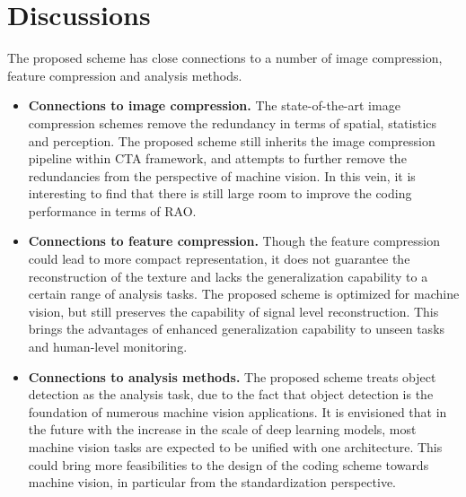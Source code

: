 \documentclass[transmag]{IEEEtran}
\begin{document}
\section{Discussions}
The proposed scheme has close connections to a number of image compression, feature compression and analysis methods.
\begin{itemize}
    \item \textbf{Connections to image compression.} The state-of-the-art image compression schemes remove the redundancy in terms of spatial, statistics and perception. The proposed scheme still inherits the image compression pipeline within CTA framework, and attempts to further remove the redundancies from the perspective of machine vision. In this vein, it is interesting to find that there is still large room to improve the coding performance in terms of RAO. 
    \item \textbf{Connections to feature compression.} Though the  feature compression could lead to more compact representation, it does not guarantee the reconstruction of the texture and lacks the generalization capability to a certain range of analysis tasks. 
    The proposed scheme is optimized for machine vision, but still preserves the capability of signal level reconstruction. This brings the advantages of enhanced generalization capability to unseen tasks and human-level monitoring. 
    \item \textbf{Connections to analysis methods.} The proposed scheme treats object detection as the analysis task, due to the fact that object detection is the foundation of numerous machine vision applications. It is envisioned that in the future with the increase in the scale of deep learning models, most machine vision tasks are expected to be unified with one architecture. This could bring more feasibilities to the design of the coding scheme towards machine vision, in particular from the standardization perspective.  
    
\end{itemize}
\end{document}
